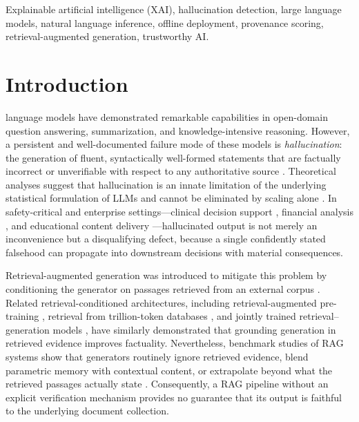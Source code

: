 \documentclass[journal]{IEEEtran}
\begin{document}
\begin{IEEEkeywords}
Explainable artificial intelligence (XAI), hallucination detection, large
language models, natural language inference, offline deployment, provenance
scoring, retrieval-augmented generation, trustworthy AI.
\end{IEEEkeywords}

\IEEEpeerreviewmaketitle

\section{Introduction}
 language models have demonstrated remarkable
capabilities in open-domain question answering, summarization, and
knowledge-intensive reasoning. However, a persistent and well-documented
failure mode of these models is \emph{hallucination}: the generation of
fluent, syntactically well-formed statements that are factually incorrect or
unverifiable with respect to any authoritative source
\cite{ji2023survey,huang2025survey,lin2022truthfulqa}. Theoretical analyses
suggest that hallucination is an innate limitation of the underlying
statistical formulation of LLMs and cannot be eliminated by scaling alone
\cite{xu2024inevitable}. In safety-critical and enterprise
settings---clinical decision support \cite{ibrahim2024clinical,pal2023medical},
financial analysis \cite{islam2023financebench}, and educational content
delivery \cite{zheng2025educational,chen2024tutoring}---hallucinated output
is not merely an inconvenience but a disqualifying defect, because a single
confidently stated falsehood can propagate into downstream decisions with
material consequences.

Retrieval-augmented generation was introduced to mitigate this problem by
conditioning the generator on passages retrieved from an external corpus
\cite{lewis2020rag}. Related retrieval-conditioned architectures, including
retrieval-augmented pre-training \cite{guu2020realm}, retrieval from
trillion-token databases \cite{borgeaud2022retro}, and jointly trained
retrieval--generation models \cite{izacard2022atlas}, have similarly
demonstrated that grounding generation in retrieved evidence improves
factuality. Nevertheless, benchmark studies of RAG systems show that
generators routinely ignore retrieved evidence, blend parametric memory with
contextual content, or extrapolate beyond what the retrieved passages
actually state \cite{chen2024benchmarking,mallen2023trust,niu2024ragtruth}.
Consequently, a RAG pipeline without an explicit verification mechanism
provides no guarantee that its output is faithful to the underlying document
collection.
\end{document}
